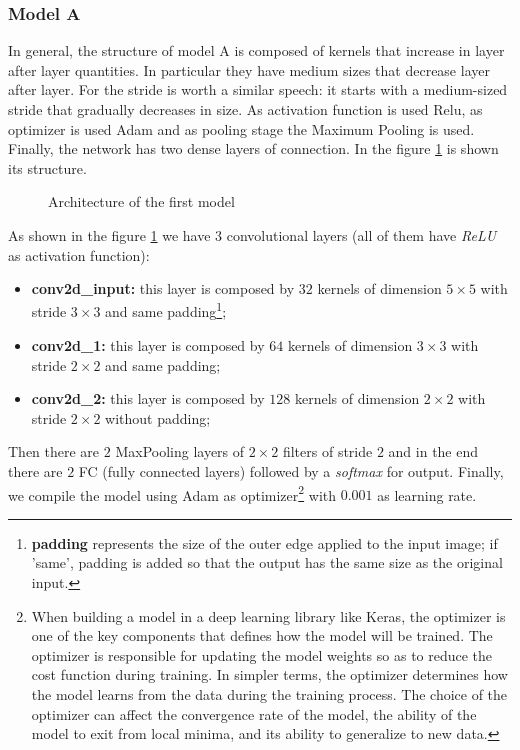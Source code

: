 \subsubsection{Model A}
In general, the structure of model A is composed of kernels that increase in layer after layer quantities. In particular they have medium sizes that decrease layer after layer. For the stride is worth a similar speech: it starts with a medium-sized stride that gradually decreases in size. As activation function is used Relu, as optimizer is used Adam and as pooling stage the Maximum Pooling is used. Finally, the network has two dense layers of connection. In the figure \ref{fig:modA} is shown its structure.
\begin{figure}[h!]
    \modA
    \caption{Architecture of the first model}
    \label{fig:modA}
\end{figure}
As shown in the figure \ref{fig:modA} we have $3$ convolutional layers (all of them have \textit{ReLU} as activation function):
\begin{itemize}
\item{\textbf{conv2d\_input:} this layer is composed by $32$ kernels of dimension $5 \times 5$ with stride $3 \times 3$ and same padding\footnote{\textbf{padding} represents the size of the outer edge applied to the input image; if 'same', padding is added so that the output has the same size as the original input.};}
\item{\textbf{conv2d\_1:} this layer is composed by $64$ kernels of dimension $3 \times 3$ with stride $2 \times 2$ and same padding;}
\item{\textbf{conv2d\_2:} this layer is composed by $128$ kernels of dimension $2 \times 2$ with stride $2 \times 2$ without padding;}
\end{itemize}
Then there are $2$ MaxPooling layers of $2 \times 2$ filters of stride $2$ and in the end there are $2$ FC (fully connected layers) followed
by a \textit{softmax} for output. Finally, we compile the model using Adam as optimizer\footnote{When building a model in a deep learning library like Keras, the optimizer is one of the key components that defines how the model will be trained. The optimizer is responsible for updating the model weights so as to reduce the cost function during training. In simpler terms, the optimizer determines how the model learns from the data during the training process. The choice of the optimizer can affect the convergence rate of the model, the ability of the model to exit from local minima, and its ability to generalize to new data.} with $0.001$ as learning rate.
